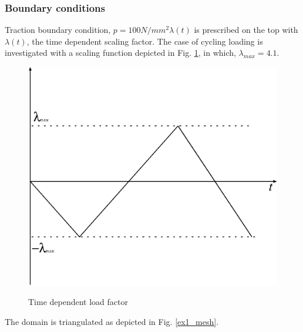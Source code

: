 \subsubsection*{Boundary conditions}

Traction boundary condition, $p=100N/mm^2\lambda(t)$  is
prescribed on the top with $\lambda(t)$, the time dependent scaling
factor. The case of  cycling loading is investigated with a scaling
function depicted in Fig. \ref{ex1_load}, in which,
$\lambda_{max}=4.1$.

\begin{figure}[!thb]
\centering
    \includegraphics[scale=0.5]{M/ex1_load.eps}\\
   \caption{Time dependent load factor}
  \label{ex1_load}
\end{figure}

The domain is triangulated as depicted in Fig. \ref{ex1_mesh}.

